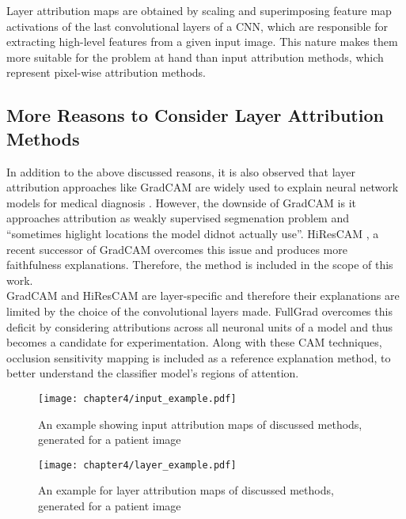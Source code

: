 \documentclass[../report.tex]{subfiles}
\begin{document}
\begin{itemize}
    	Layer attribution maps are obtained by scaling and superimposing feature map activations of the last convolutional layers of a CNN, which are responsible for extracting high-level features from a given input image. This nature makes them more suitable for the problem at hand than input attribution methods, which represent pixel-wise attribution methods.
    \end{itemize}
	
    \subsection{More Reasons to Consider Layer Attribution Methods}
    In addition to the above discussed reasons, it is also observed that layer attribution approaches like GradCAM are widely used to explain neural network models for medical diagnosis \cite{lee2019explainable} \cite{nunnari2021overlap} \cite{hicks2021explaining}. However, the downside of GradCAM is it approaches
    attribution as weakly supervised segmenation problem and \enquote{sometimes higlight locations the model didnot actually use}\cite{draelos2020hirescam}. HiResCAM \cite{draelos2020hirescam}, a recent successor of GradCAM overcomes this issue and produces more faithfulness explanations. Therefore, the method is included in the scope of this work.\\
    GradCAM and HiResCAM are layer-specific and therefore their explanations are limited by the choice of the convolutional layers made. FullGrad \cite{srinivas2019full} overcomes this deficit by considering attributions across all neuronal units of a model and thus becomes a candidate for experimentation. Along with these CAM techniques, occlusion sensitivity mapping is included as a reference explanation method, to better understand the classifier model's regions of attention.
    \begin{figure}[H]
		\hspace*{-2cm}    
    	\texttt{[image: chapter4/input\_example.pdf]}
    	\caption{An example showing input attribution maps of discussed methods, generated for a patient image}
    	\label{example_ipa}
    	 \vspace{1cm}
    	\hspace*{-1.0cm}    
    	\texttt{[image: chapter4/layer\_example.pdf]}
    	\caption{An example for layer attribution maps of discussed methods, generated for a patient image}
    	\label{example_la}
    \end{figure}
\end{document}
